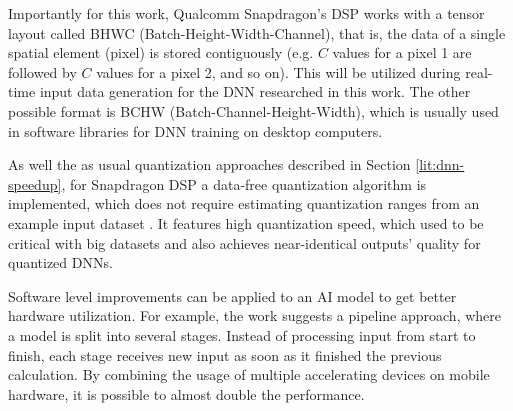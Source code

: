 Importantly for this work, Qualcomm Snapdragon's DSP works with a tensor layout called BHWC (Batch-Height-Width-Channel), that is, the data of a single spatial element (pixel) is stored contiguously (e.g. $C$ values for a pixel 1 are followed by $C$ values for a pixel 2, and so on). This will be utilized during real-time input data generation for the DNN researched in this work. The other possible format is BCHW (Batch-Channel-Height-Width), which is usually used in software libraries for DNN training on desktop computers.

As well the as usual quantization approaches described in Section \ref{lit:dnn-speedup}, for Snapdragon DSP a data-free quantization algorithm is implemented, which does not require estimating quantization ranges from an example input dataset \cite{speed:datafreequant19}. It features high quantization speed, which used to be critical with big datasets and also achieves near-identical outputs' quality for quantized DNNs.

Software level improvements can be applied to an AI model to get better hardware utilization. For example, the work \cite{mobile:pipelining20} suggests a pipeline approach, where a model is split into several stages. Instead of processing input from start to finish, each stage receives new input as soon as it finished the previous calculation. By combining the usage of multiple accelerating devices on mobile hardware, it is possible to almost double the performance.


